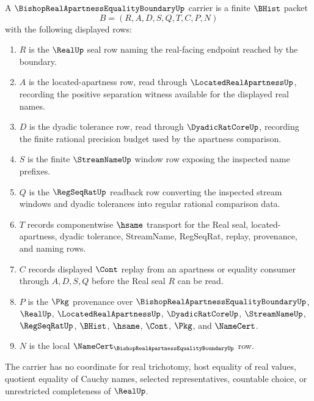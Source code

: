 \begin{definition}
\label{def:bishop-real-apartness-equality-boundary-carrier}
A $\BishopRealApartnessEqualityBoundaryUp$ carrier is a finite $\BHist$ packet
$$
B=(R,A,D,S,Q,T,C,P,N)
$$
with the following displayed rows:
\begin{enumerate}
\item $R$ is the $\RealUp$ seal row naming the real-facing endpoint reached by the boundary.
\item $A$ is the located-apartness row, read through $\LocatedRealApartnessUp$, recording the positive separation witness available for the displayed real names.
\item $D$ is the dyadic tolerance row, read through $\DyadicRatCoreUp$, recording the finite rational precision budget used by the apartness comparison.
\item $S$ is the finite $\StreamNameUp$ window row exposing the inspected name prefixes.
\item $Q$ is the $\RegSeqRatUp$ readback row converting the inspected stream windows and dyadic tolerances into regular rational comparison data.
\item $T$ records componentwise $\hsame$ transport for the Real seal, located-apartness, dyadic tolerance, StreamName, RegSeqRat, replay, provenance, and naming rows.
\item $C$ records displayed $\Cont$ replay from an apartness or equality consumer through $A,D,S,Q$ before the Real seal $R$ can be read.
\item $P$ is the $\Pkg$ provenance over $\BishopRealApartnessEqualityBoundaryUp$, $\RealUp$, $\LocatedRealApartnessUp$, $\DyadicRatCoreUp$, $\StreamNameUp$, $\RegSeqRatUp$, $\BHist$, $\hsame$, $\Cont$, $\Pkg$, and $\NameCert$.
\item $N$ is the local $\NameCert_{\BishopRealApartnessEqualityBoundaryUp}$ row.
\end{enumerate}
The carrier has no coordinate for real trichotomy, host equality of real values, quotient equality of Cauchy names, selected representatives, countable choice, or unrestricted completeness of $\RealUp$.
\end{definition}


